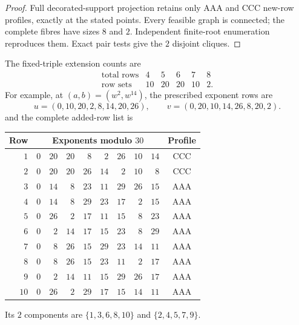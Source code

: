 \documentclass[11pt,a4paper]{article}
\theoremstyle{plain}
\theoremstyle{definition}
\numberwithin{equation}{section}
\begin{document}
\begin{proof}
Full decorated-support projection retains only AAA and CCC new-row profiles, exactly at the stated points. Every feasible graph is connected; the complete fibres have sizes $8$ and $2$. Independent finite-root enumeration reproduces them. Exact pair tests give the $2$ disjoint cliques.
\end{proof}
The fixed-triple extension counts are
$$
\begin{array}{c|rrrrr}
\text{total rows}&4&5&6&7&8\\\hline
\text{row sets}&10&20&20&10&2.
\end{array}
$$
For example, at $(a,b)=(w^2,w^{14})$, the prescribed exponent rows are
$$
u=(0,10,20,2,8,14,20,26),\qquad
v=(0,20,10,14,26,8,20,2).
$$
and the complete added-row list is
\begin{center}\small \begin{tabular}{r|rrrrrrrr|c}\toprule Row&\multicolumn{8}{c|}{Exponents modulo $30$}&Profile\\\midrule
$1$&$0$&$20$&$20$&$8$&$2$&$26$&$10$&$14$&CCC\\
$2$&$0$&$20$&$20$&$26$&$14$&$2$&$10$&$8$&CCC\\
$3$&$0$&$14$&$8$&$23$&$11$&$29$&$26$&$15$&AAA\\
$4$&$0$&$14$&$8$&$29$&$23$&$17$&$2$&$15$&AAA\\
$5$&$0$&$26$&$2$&$17$&$11$&$15$&$8$&$23$&AAA\\
$6$&$0$&$2$&$14$&$17$&$15$&$23$&$8$&$29$&AAA\\
$7$&$0$&$8$&$26$&$15$&$29$&$23$&$14$&$11$&AAA\\
$8$&$0$&$8$&$26$&$15$&$23$&$11$&$2$&$17$&AAA\\
$9$&$0$&$2$&$14$&$11$&$15$&$29$&$26$&$17$&AAA\\
$10$&$0$&$26$&$2$&$29$&$17$&$15$&$14$&$11$&AAA\\
\bottomrule\end{tabular}\end{center}
Its $2$ components are $\{1,3,6,8,10\}$ and $\{2,4,5,7,9\}$.
\end{document}
